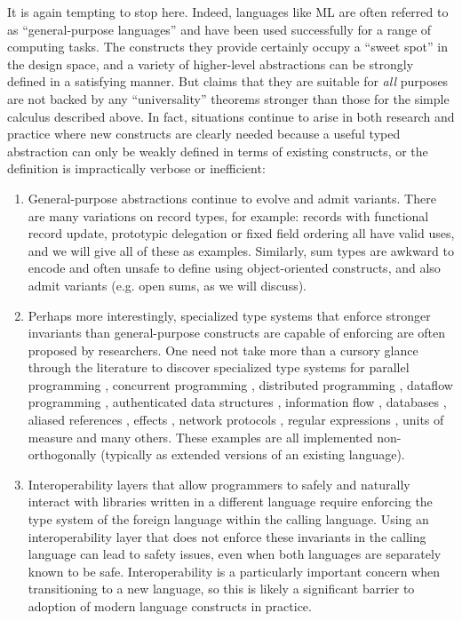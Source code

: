 It is again tempting to stop here. Indeed, languages like ML are often referred to as ``general-purpose languages'' and have been used successfully for a range of computing tasks. The constructs they provide certainly occupy a ``sweet spot'' in the design space, and a variety of higher-level abstractions can be strongly defined in a satisfying manner. But claims that they are suitable for \emph{all} purposes are not backed by any ``universality'' theorems stronger than those for the simple calculus described above. In fact, situations continue to arise in both research and practice where new constructs are clearly needed because a useful typed abstraction can only be weakly defined in terms of existing constructs, or the definition is impractically verbose or inefficient:

\begin{enumerate}
\item General-purpose abstractions continue to evolve and admit variants. There are many  variations on record types, for example: records with functional record update, prototypic delegation or fixed field ordering all have valid uses, and we will give all of these as examples. Similarly, sum types are awkward to encode and often unsafe to define using object-oriented constructs, and also admit variants (e.g. open sums, as we will discuss).

\item Perhaps more interestingly, specialized type systems that enforce stronger invariants than general-purpose constructs are capable of enforcing are often proposed by researchers. One need not take more than a cursory glance through the literature to discover specialized type systems for parallel programming \cite{a,b}, concurrent programming \cite{cml,a,b}, distributed programming \cite{tom7}, dataflow programming \cite{reactiveml}, authenticated data structures \cite{popl13}, information flow \cite{walker00, smith2001}, databases \cite{db}, aliased references \cite{naden12}, effects \cite{effects},  network protocols \cite{sekar99}, regular expressions \cite{regex}, units of measure \cite{keneddy} and many others. These examples are all implemented non-orthogonally (typically as extended versions of an existing language).
\item Interoperability layers that allow programmers to safely and naturally interact with libraries written in a different language require enforcing the type system of the foreign language within the calling language. Using  an interoperability layer that does not enforce these invariants in the calling language can lead to safety issues, even when both languages are separately known to be safe. Interoperability is a particularly important concern when transitioning to a new language, so this is likely a significant barrier to adoption of modern language constructs in practice.
\end{enumerate}
